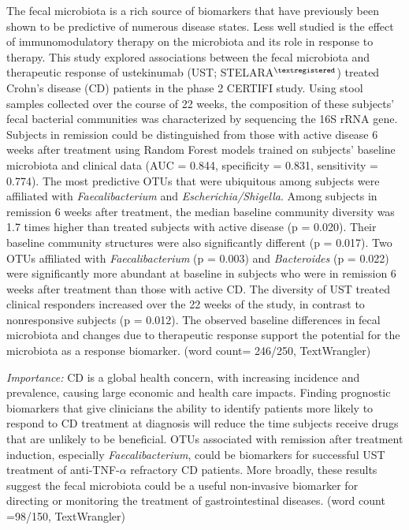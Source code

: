 \documentclass[12pt,]{article}
\begin{document}
The fecal microbiota is a rich source of biomarkers that have previously
been shown to be predictive of numerous disease states. Less well
studied is the effect of immunomodulatory therapy on the microbiota and
its role in response to therapy. This study explored associations
between the fecal microbiota and therapeutic response of ustekinumab
(UST; STELARA\(^{\textregistered}\)) treated Crohn's disease (CD)
patients in the phase 2 CERTIFI study. Using stool samples collected
over the course of 22 weeks, the composition of these subjects' fecal
bacterial communities was characterized by sequencing the 16S rRNA gene.
Subjects in remission could be distinguished from those with active
disease 6 weeks after treatment using Random Forest models trained on
subjects' baseline microbiota and clinical data (AUC = 0.844,
specificity = 0.831, sensitivity = 0.774). The most predictive OTUs that
were ubiquitous among subjects were affiliated with
\emph{Faecalibacterium} and \emph{Escherichia/Shigella}. Among subjects
in remission 6 weeks after treatment, the median baseline community
diversity was 1.7 times higher than treated subjects with active disease
(p = 0.020). Their baseline community structures were also significantly
different (p = 0.017). Two OTUs affiliated with \emph{Faecalibacterium}
(p = 0.003) and \emph{Bacteroides} (p = 0.022) were significantly more
abundant at baseline in subjects who were in remission 6 weeks after
treatment than those with active CD. The diversity of UST treated
clinical responders increased over the 22 weeks of the study, in
contrast to nonresponsive subjects (p = 0.012). The observed baseline
differences in fecal microbiota and changes due to therapeutic response
support the potential for the microbiota as a response biomarker. (word
count= 246/250, TextWrangler)

\emph{Importance:} CD is a global health concern, with increasing
incidence and prevalence, causing large economic and health care
impacts. Finding prognostic biomarkers that give clinicians the ability
to identify patients more likely to respond to CD treatment at diagnosis
will reduce the time subjects receive drugs that are unlikely to be
beneficial. OTUs associated with remission after treatment induction,
especially \emph{Faecalibacterium}, could be biomarkers for successful
UST treatment of anti-TNF-\({\alpha}\) refractory CD patients. More
broadly, these results suggest the fecal microbiota could be a useful
non-invasive biomarker for directing or monitoring the treatment of
gastrointestinal diseases. (word count =98/150, TextWrangler)
\end{document}
